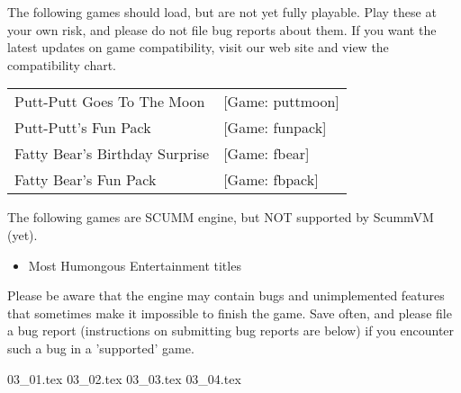 \begin{itemize}
  The following games should load, but are not yet fully playable. Play these at your own risk, and please do not file bug reports about them. If you want
the latest updates on game compatibility, visit our web site and view the
compatibility chart.

\begin{tabular}{ll}
  Putt-Putt Goes To The Moon&                    [Game: puttmoon]\\
  Putt-Putt's Fun Pack&                          [Game: funpack]\\
  Fatty Bear's Birthday Surprise&                [Game: fbear]\\
  Fatty Bear's Fun Pack&                         [Game: fbpack]\\
\end{tabular}

  The following games are SCUMM engine, but NOT supported by ScummVM (yet).
  \begin{itemize}
  \item Most Humongous Entertainment titles
  \end{itemize}
%
Please be aware that the engine may contain bugs and unimplemented features
that sometimes make it impossible to finish the game. Save often, and please
file a bug report (instructions on submitting bug reports are below) if you
encounter such a bug in a 'supported' game.
\end{itemize}
 {03_01.tex}
 {03_02.tex}
 {03_03.tex}
 {03_04.tex}


